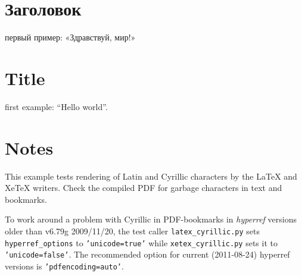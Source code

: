 \documentclass[a4paper,russian]{article}
\providecommand*{\DUroletitlereference}[1]{\textsl{#1}}
\begin{document}
\section{Заголовок%
  \label{section-1}%
}

первый пример: «Здравствуй, мир!»


\section{Title%
  \label{title}%
}

\foreignlanguage{english}{first example: “Hello world”.}


\section{Notes%
  \label{notes}%
}

\foreignlanguage{english}{This example tests rendering of Latin and Cyrillic characters by the LaTeX
and XeTeX writers. Check the compiled PDF for garbage characters in text and
bookmarks.}

\foreignlanguage{english}{To work around a problem with Cyrillic in PDF-bookmarks in \DUroletitlereference{hyperref}
versions older than v6.79g 2009/11/20, the test caller \texttt{latex\_cyrillic.py}
sets \texttt{hyperref\_options} to \texttt{'unicode=true'} while \texttt{xetex\_cyrillic.py}
sets it to \texttt{'unicode=false'}. The recommended option for current
(2011-08-24) hyperref versions is \texttt{'pdfencoding=auto'}.}
\end{document}
